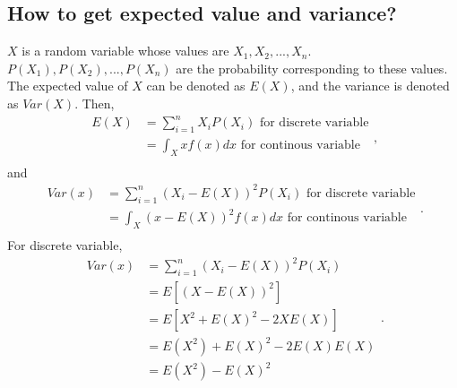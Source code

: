 \documentclass[10pt,onecolumn]{book}
\begin{document}
\subsection{How to get expected value and variance?}
$X$ is a random variable whose values are $X_{1}, X_{2}, ..., X_{n}$. $P(X_{1}), P(X_{2}), ..., P(X_{n})$ are the probability corresponding to these values. The expected value of $X$ can be denoted as $E(X)$, and the variance is denoted as $Var(X)$. Then, 
\begin{equation}
\begin{split}
	E(X) & = \sum_{i = 1}^{n} X_{i}P(X_{i}) \text{\ for discrete variable} \\
		 & = \int_{X}xf(x)dx \text{\ for continous variable} \\	
\end{split},
\end{equation}
and
\begin{equation}
\begin{split}
	Var(x) & = \sum_{i = 1}^{n} (X_{i} - E(X))^2 P(X_{i}) \text{\ for discrete variable} \\
		 & = \int_{X}(x - E(X))^2 f(x) dx  \text{\ for continous variable} \\	
\end{split}.
\end{equation}
For discrete variable, 
\begin{equation}
\begin{split}
	Var(x) & = \sum_{i = 1}^{n} (X_{i} - E(X))^2 P(X_{i}) \\
		   & = E[(X - E(X))^2] \\
		   & = E[X^2 + E(X)^2 - 2XE(X)] \\
		   & = E(X^2) + E(X)^2 - 2E(X)E(X) \\
		   & = E(X^2) - E(X)^2
\end{split}.
\end{equation}
\end{document}
